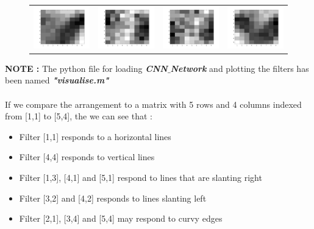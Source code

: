 \documentclass{article} %
\begin{document}
\begin{figure}[H]
\begin{tabular}{cccc}
\\
\includegraphics[width=0.2\linewidth]{images/Fig_grey_17.png}
&
\includegraphics[width=0.2\linewidth]{images/Fig_grey_18.png}
&
\includegraphics[width=0.2\linewidth]{images/Fig_grey_19.png}
&
\includegraphics[width=0.2\linewidth]{images/Fig_grey_20.png}
\end{tabular}
\end{figure}



\textbf{NOTE : }The python file for loading \textbf{\textit{CNN$\_$Network}} and plotting the filters has been named \textbf{\textit{"visualise.m"}}\\\\

If we compare the arrangement to a matrix with 5 rows and 4 columns indexed from [1,1] to [5,4], the we can see that :
\begin{itemize}
    \item Filter [1,1] responds to a horizontal lines
    \item Filter [4,4] responds to vertical lines
    \item Filter [1,3], [4,1] and [5,1] respond to lines that are slanting right
    \item Filter [3,2] and [4,2] responds to lines slanting left
    \item Filter [2,1], [3,4] and [5,4] may respond to curvy edges
\end{itemize}
\end{document}
